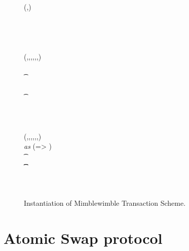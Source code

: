 \begin{figure}
\begin{center}
{\begin{varwidth}{\textwidth}
{            (\varCoinOutBob,\varProofBob) \opFunResult \procCreateCoin{\varFundValue}{\funStar{\varBlindingFactorBob}} \\
            \varSecKeyBob \opAssign \funStar{\varBlindingFactorBob} \\
            \varSigContext \opFunResult \procSetupCtx{\varSigContext}{\funGen{\varSecKeyBob}}{\funGen{\varNonceBob}} \\
            \varSigBob \opFunResult {} \\
            \varPreTx \opFunResult \procCreatePreTx{\varMsg}{\varInputs}{\varOutputs \opConc \varCoinOutBob}{\varProofs \opConc \varProofBob}{\varSigContext}{\varCommits \opConc \funGen{\varNonceBob}}{\varSigBob} \\
            \pcreturn \varPreTx
            }
            \procedure[linenumbering]{$\procFinTx{\varPreTx}{\varSecKeyAlice}$} {
            (\varMsg,\varInputs,\varOutputs,\varProofs,\varSigContext,\varCommits,\varSigBob) \opFunResult \varPreTx \\
            \pcif \procVerfProof{\varProofs[1]}{\varOutputs[1]}  \\
            \t \pcreturn \cnstFalsum \\
            \pcif \procVerfPtSig{\varSigBob}{\varMsg}{\varCommits[1]}  \\
            \t \pcreturn \cnstFalsum \\
            \varSigAlice \opFunResult {} \\
            \varSigFin \opFunResult \procFinSig{\varSigAlice}{\varSigBob} \\
            \varTx \opFunResult \procCreatePreTx{\varMsg}{\varInputs}{\varOutputs}{\varProofs}{\varSigContext}{\varCommits}{\varSigFin} \\
            \pcreturn \varTx
            }
            \procedure[linenumbering]{$\procVerfTx{\varTx}$} {
            (\varMsg,\varInputs,\varOutputs,\varProofs,\varSigContext,\varCommits,\varSignature) \opFunResult \varTx \\
            \pcforeach \varOutputs \textit{ as } (\varIterator => \varCoinOut) \\
            \t \pcif \procVerfProof{\varProofs[\varIterator]}{\varCoinOut}  \\
            \t \t {} \\
            \varPubKey \opAssign \sum \varOutputs \opSub \sum \varInputs \\
            \pcreturn \procVerf{\varSignature}{\varMsg}{\varPubKey}\\
            }
        \end{varwidth}
        }
    \end{center}
    \caption{Instantiation of Mimblewimble Transaction Scheme. \label{fig:inst-mw-tx}}
\end{figure}

\section{Atomic Swap protocol}\label{sec:atomic-swap}